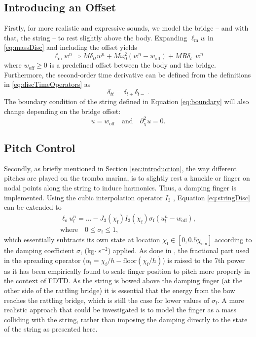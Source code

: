 \documentclass[dvipsnames, pdftex]{article}
\def\stringx{\chi}
\def\us{u}
\def\um{w}
\begin{document}
\subsection{Introducing an Offset}
Firstly, for more realistic and expressive sounds, we model the bridge -- and with that, the string -- to rest slightly above the body. Expanding $\ell_\text{m}\um$ in \eqref{eq:massDisc} and including the offset yields
\begin{equation}\label{eq:offset}
    \ell_\text{m}\um^n \Rightarrow M\delta_{tt}\um^n+M\omega_0^2(\um^n-\um_\text{off})+MR\delta_{t\cdot}\um^n
\end{equation}
where $\um_\text{off} \geq 0$ is a predefined offset between the body and the bridge. Furthermore, the second-order time derivative can be defined from the definitions in \eqref{eq:discTimeOperators} as
\begin{equation}
    \delta_{tt} = \delta_{t+}\delta_{t-}\ .
\end{equation}
The boundary condition of the string defined in Equation \eqref{eq:boundary} will also change depending on the bridge offset:
\begin{equation}\label{eq:newBoundary}
    \us = \um_\text{off}\quad \text{and} \quad \partial_\stringx^2\us=0.
\end{equation}

\subsection{Pitch Control}
Secondly, as briefly mentioned in Section \ref{sec:introduction}, the way different pitches are played on the tromba marina, is to slightly rest a knuckle or finger on nodal points along the string to induce harmonics. Thus, a damping finger is implemented. Using the cubic interpolation operator $I_3$ \cite{bilbao2009numerical}, Equation \eqref{eq:stringDisc} can be extended to
\begin{gather}\label{eq:dampingFinger}
    \ell_\text{s} \us_l^n = \hdots - J_3(\stringx_\text{f})I_3(\stringx_\text{f})\sigma_\text{f}(\us^n_l-\um_\text{off}),\\
   \text{where} \quad 0\leq \sigma_\text{f} \leq 1,\nonumber
\end{gather}
which essentially subtracts its own state at location $\stringx_\text{f} \in [0,0.5\stringx_\text{sm}]$ according to the damping coefficient $\sigma_\text{f}$ (kg$ \cdot$ s$^{-2}$) applied. As done in \cite{Willemsen2019a:SMC2020}, the fractional part used in the spreading operator ($\alpha_\text{i} = \stringx_\text{f}/h - \text{floor}(\stringx_\text{f}/h)$) is raised to the 7th power as it has been empirically found to scale finger position to pitch more properly in the context of FDTD. As the string is bowed above the damping finger (at the other side of the rattling bridge) it is essential that the energy from the bow reaches the rattling bridge, which is still the case for lower values of $\sigma_\text{f}$. A more realistic approach that could be investigated is to model the finger as a mass colliding with the string, rather than imposing the damping directly to the state of the string as presented here.
\end{document}
